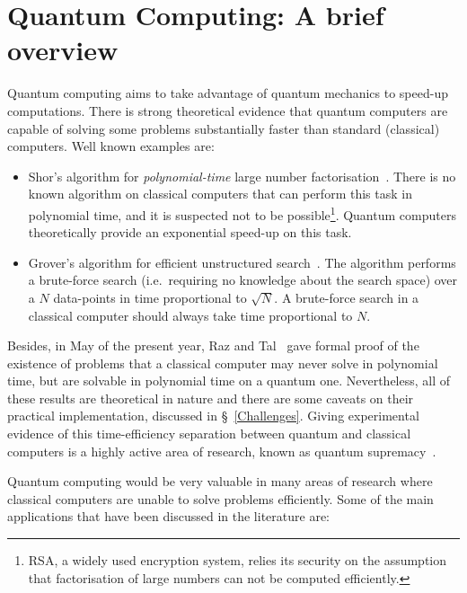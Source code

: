 \chapter{Quantum Computing: A brief overview}

Quantum computing aims to take advantage of quantum mechanics to speed-up computations. There is strong theoretical evidence that quantum computers are capable of solving some problems substantially faster than standard (classical) computers. Well known examples are:

\begin{itemize} 
  \item Shor's algorithm for \textit{polynomial-time} large number factorisation~\citep{Shor}. There is no known algorithm on classical computers that can perform this task in polynomial time, and it is suspected not to be possible\footnote{RSA, a widely used encryption system, relies its security on the assumption that factorisation of large numbers can not be computed efficiently.}. Quantum computers theoretically provide an exponential speed-up on this task.
  \item Grover's algorithm for efficient unstructured search~\citep{Grover}. The algorithm performs a brute-force search (i.e.\ requiring no knowledge about the search space) over a \(N\) data-points in time proportional to \(\sqrt{N}\). A brute-force search in a classical computer should always take time proportional to \(N\).
\end{itemize}

Besides, in May of the present year, Raz and Tal~\citep{BQPSepPH} gave formal proof of the existence of problems that a classical computer may never solve in polynomial time, but are solvable in polynomial time on a quantum one. Nevertheless, all of these results are theoretical in nature and there are some caveats on their practical implementation, discussed in \S~\ref{Challenges}. Giving experimental evidence of this time-efficiency separation between quantum and classical computers is a highly active area of research, known as quantum supremacy~\citep{QSupremacySurvey}. 

Quantum computing would be very valuable in many areas of research where classical computers are unable to solve problems efficiently. Some of the main applications that have been discussed in the literature are:

